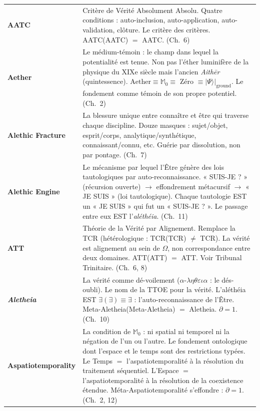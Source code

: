 \documentclass[10pt, openany, oneside]{book}
\renewcommand{\footnotesize}{\fontsize{8.5}{11}\selectfont}
\begin{document}
{\footnotesize
\noindent\begin{tabular}{@{} l @{\hspace{0.6em}} p{} @{}}
\textbf{AATC} & Critère de Vérité Absolument Absolu. Quatre conditions : auto-inclusion, auto-application, auto-validation, clôture. Le critère des critères. AATC(AATC) $=$ AATC. (Ch.\ 6) \\[0.3em]
\textbf{Aether} & Le médium-témoin : le champ dans lequel la potentialité est tenue. Non pas l'éther luminifère de la physique du XIXe siècle mais l'ancien \textit{Aith\={e}r} (quintessence). $\text{Aether} \equiv \mathbb{M}_0 \equiv$ Zéro $\equiv |\Psi\rangle|_{\text{ground}}$. Le fondement comme témoin de son propre potentiel. (Ch.\ 2) \\[0.3em]
\textbf{Alethic Fracture} & La blessure unique entre connaître et être qui traverse chaque discipline. Douze masques : sujet/objet, esprit/corps, analytique/synthétique, connaissant/connu, etc. Guérie par dissolution, non par pontage. (Ch.\ 7) \\[0.3em]
\textbf{Alethic Engine} & Le mécanisme par lequel l'Être génère des lois tautologiques par auto-reconnaissance. « SUIS-JE ? » (récursion ouverte) $\to$ effondrement métacursif $\to$ « JE SUIS » (loi tautologique). Chaque tautologie EST un « JE SUIS » qui fut un « SUIS-JE ? ». Le passage entre eux EST l'\textit{aléthéia}. (Ch.\ 11) \\[0.3em]
\textbf{ATT} & Théorie de la Vérité par Alignement. Remplace la TCR (hétérologique : TCR(TCR) $\neq$ TCR). La vérité est alignement au sein de $\Omega$, non correspondance entre deux domaines. ATT(ATT) $=$ ATT. Voir Tribunal Trinitaire. (Ch.\ 6, 8) \\[0.3em]
\textbf{\textit{Aletheia}} & La vérité comme dé-voilement ($\alpha$-$\lambda\eta\theta\varepsilon\iota\alpha$ : le dés-oubli). Le nom de la TTOE pour la vérité. L'aléthéia EST $\exists(\exists) \equiv \exists$ : l'auto-reconnaissance de l'Être. Meta-Aletheia(Meta-Aletheia) $=$ Aletheia. $\partial = 1$. (Ch.\ 10) \\[0.3em]
\textbf{Aspatiotemporality} & La condition de $\mathbb{M}_0$ : ni spatial ni temporel ni la négation de l'un ou l'autre. Le fondement ontologique dont l'espace et le temps sont des restrictions typées. Le Temps $=$ l'aspatiotemporalité à la résolution du traitement séquentiel. L'Espace $=$ l'aspatiotemporalité à la résolution de la coexistence étendue. Méta-Aspatiotemporalité s'effondre : $\partial = 1$. (Ch.\ 2, 12) \\[0.3em]
\end{tabular}
}
\end{document}
